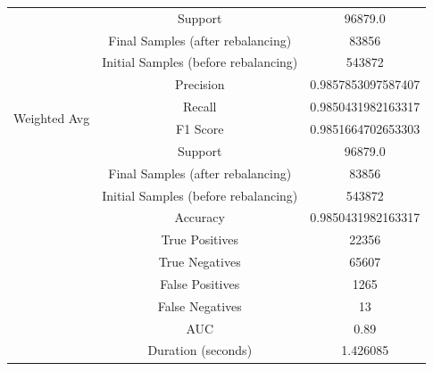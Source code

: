 \begin{longtable}{|c|c|c|}
 & Support & 96879.0 \\
 & Final Samples (after rebalancing) & 83856 \\
 & Initial Samples (before rebalancing) & 543872 \\
\hline
\multirow{4}{*}{Weighted Avg} & Precision & 0.9857853097587407 \\
 & Recall & 0.9850431982163317 \\
 & F1 Score & 0.9851664702653303 \\
 & Support & 96879.0 \\
 & Final Samples (after rebalancing) & 83856 \\
 & Initial Samples (before rebalancing) & 543872 \\
\hline
& Accuracy & 0.9850431982163317 \\ \hline
& True Positives & 22356 \\ \hline
& True Negatives & 65607 \\ \hline
& False Positives & 1265 \\ \hline
& False Negatives & 13 \\ \hline
& AUC & 0.89 \\ \hline
& Duration (seconds) & 1.426085 \\ \hline
\end{longtable}


